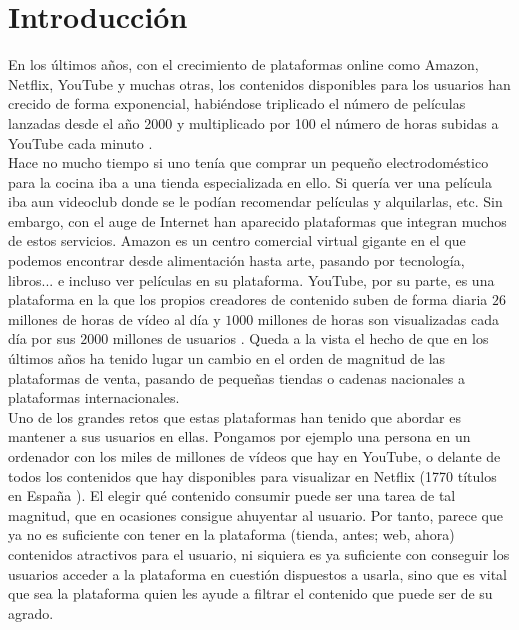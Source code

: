 \chapter{Introducción}\label{chap:introduccion}

En los últimos años, con el crecimiento de plataformas online como Amazon, Netflix, YouTube y muchas otras, los contenidos disponibles para los usuarios han crecido de forma exponencial, habiéndose triplicado el número de películas lanzadas desde el año 2000 \cite{watson_2020} y multiplicado por 100 el número de horas subidas a YouTube cada minuto \cite{clement_2019}. \\

Hace no mucho tiempo si uno tenía que comprar un pequeño electrodoméstico para la cocina iba a una tienda especializada en ello. Si quería ver una película iba aun videoclub donde se le podían recomendar películas y alquilarlas, etc. Sin embargo, con el auge de Internet han aparecido plataformas que integran muchos de estos servicios. Amazon es un centro comercial virtual gigante en el que podemos encontrar desde alimentación hasta arte, pasando por tecnología, libros... e incluso ver películas en su plataforma. YouTube, por su parte, es una plataforma en la que los propios creadores de contenido suben de forma diaria $26$ millones de horas de vídeo al día y $1000$ millones de horas son visualizadas cada día por sus $2000$ millones de usuarios \cite{YoutubeStats}. Queda a la vista el hecho de que en los últimos años ha tenido lugar un cambio en el orden de magnitud de las plataformas de venta, pasando de pequeñas tiendas o cadenas nacionales a plataformas internacionales.\\

Uno de los grandes retos que estas plataformas han tenido que abordar es mantener a sus usuarios en ellas. Pongamos por ejemplo una persona en un ordenador con los miles de millones de vídeos que hay en YouTube, o delante de todos los contenidos que hay disponibles para visualizar en Netflix (1770 títulos en España \cite{Lovely2019}). El elegir qué contenido consumir puede ser una tarea de tal magnitud, que en ocasiones consigue ahuyentar al usuario. Por tanto, parece que ya no es suficiente con tener en la plataforma (tienda, antes; web, ahora) contenidos atractivos para el usuario, ni siquiera es ya suficiente con conseguir los usuarios acceder a la plataforma en cuestión dispuestos a usarla, sino que es vital que sea la plataforma quien les ayude a filtrar el contenido que puede ser de su agrado.\\


